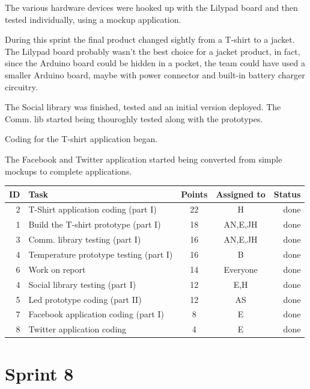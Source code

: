 The various hardware devices were hooked up with the Lilypad board and
then tested individually, using a mockup application.

During this sprint the final product changed sightly from a T-shirt to a jacket.
The Lilypad board probably wasn't the best choice for a jacket product, in fact,
since the Arduino board could be hidden in a pocket, the team could have used
a smaller Arduino board, maybe with power connector and built-in battery
charger circuitry.

The Social library was finished, tested and an initial version deployed.
The Comm. lib started being thouroghly tested along with the prototypes.

Coding for the T-shirt application began.

The Facebook and Twitter application started being converted from simple
mockups to complete applications.




\begin{table}[ht!]
\begin{tabular}{ | r | l | c | c | r | }

\hline
\textbf{ID} & \textbf{Task} & \textbf{Points} & \textbf{Assigned to} & \textbf{Status} \\
\hline


2 & T-Shirt application coding (part I)			& 22 & H			& done \\
\hline
1 & Build the T-shirt prototype (part I)		& 18 & AN,E,JH	& done \\
\hline
3 & Comm. library testing (part I)				& 16 & AN,E,JH	& done \\
\hline
4 & Temperature prototype testing	(part I)	& 16 & B			& done \\
\hline
6 & Work on report								& 14 & Everyone		& done \\
\hline
4 & Social library testing (part I)				& 12 & E,H			& done \\
\hline
5 & Led prototype coding (part II)				& 12 & AS			& done \\
\hline
7 & Facebook application coding (part I)		& 8  & E			& done \\
\hline
8 & Twitter application coding					& 4  & E			& done \\
\hline

\end{tabular}
\end{table}

\newpage

\section{Sprint 8}

